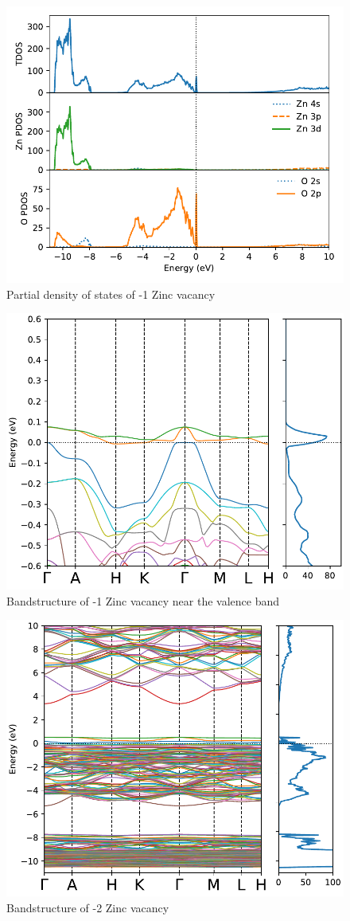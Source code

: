 \begin{figure}[tbh!]
	\centering
	\includegraphics[width=0.6\linewidth]{"images/rnd/dos-pdos_Zn_vac-n1"}
	\caption[Partial density of states of -1 Zinc vacancy]{Partial density of states of -1 Zinc vacancy}
\end{figure}

\begin{figure}[tbh!]
	\centering
	\includegraphics[width=0.6\linewidth]{"images/rnd/band-dos-close_Zn_vac-n1"}
	\caption[Bandstructure of -1 Zinc vacancy near the valence band]{Bandstructure of -1 Zinc vacancy near the valence band}
\end{figure}

\begin{figure}[tbh!]
	\centering
	\includegraphics[width=0.6\linewidth]{"images/rnd/band-dos_Zn_vac-n2"}
	\caption[Bandstructure of -2 Zinc vacancy]{Bandstructure of -2 Zinc vacancy}
\end{figure}

